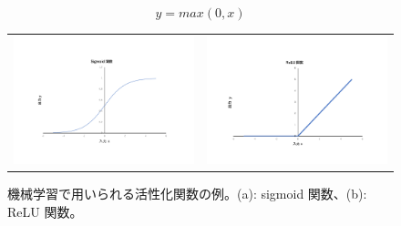 \begin{equation}
    y = max(0,x)
    \label{equ:ReLU}
\end{equation}
\begin{figure}
    \begin{tabular}{cc}
    \begin{minipage}[b]{0.45\hsize}
        \includegraphics[clip, width=7cm]{fig/4/sigmoid_2.pdf}
        \subcaption{}
        \label{fig:sigmoid}
    \end{minipage}&
    \begin{minipage}[b]{0.45\hsize}
        \includegraphics[clip, width=7cm]{fig/4/ReLU_2.pdf}
        \subcaption{}
        \label{fig:ReLU}
    \end{minipage}
    \end{tabular}
    \caption{機械学習で用いられる活性化関数の例。(a): sigmoid 関数、(b): ReLU 関数。}
    \label{fig:acctivation}
\end{figure}
